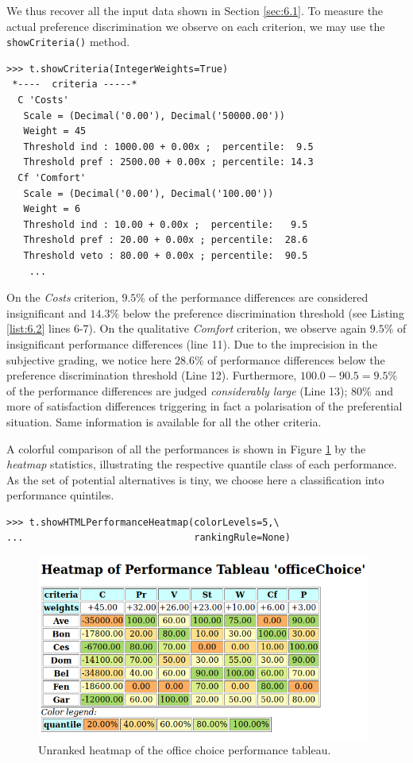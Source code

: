 We thus recover all the input data shown in Section \ref{sec:6.1}. To measure the actual preference discrimination we observe on each criterion, we may use the \texttt{showCriteria()} method.
\begin{lstlisting}[caption={Inspecting the performance criteria},label=list:6.2]
>>> t.showCriteria(IntegerWeights=True)
 *----  criteria -----*
  C 'Costs'
   Scale = (Decimal('0.00'), Decimal('50000.00'))
   Weight = 45
   Threshold ind : 1000.00 + 0.00x ;  percentile:  9.5
   Threshold pref : 2500.00 + 0.00x ; percentile: 14.3
  Cf 'Comfort'
   Scale = (Decimal('0.00'), Decimal('100.00'))
   Weight = 6
   Threshold ind : 10.00 + 0.00x ;  percentile:   9.5
   Threshold pref : 20.00 + 0.00x ; percentile:  28.6
   Threshold veto : 80.00 + 0.00x ; percentile:  90.5
    ...
\end{lstlisting}
On the \emph{Costs} criterion, $9.5\%$ of the performance differences are considered insignificant and $14.3\%$ below the preference discrimination threshold (see Listing \ref{list:6.2} lines 6-7). On the qualitative \emph{Comfort} criterion, we observe again $9.5\%$ of insignificant performance differences (line 11). Due to the imprecision in the subjective grading, we notice here $28.6\%$ of performance differences below the preference discrimination threshold (Line 12). Furthermore, $100.0 - 90.5 = 9.5\%$ of the performance differences are judged \emph{considerably large} (Line 13); $80\%$ and more of satisfaction differences triggering in fact a polarisation of the preferential situation. Same information is available for all the other criteria. 
 
A colorful comparison of all the performances is shown in Figure \ref{fig:6.1} by the \emph{heatmap} statistics, illustrating the respective quantile class of each performance. As the set of potential alternatives is tiny, we choose here a classification into performance quintiles.
\begin{lstlisting}
>>> t.showHTMLPerformanceHeatmap(colorLevels=5,\
...                              rankingRule=None)
\end{lstlisting}
    \begin{figure}[h]
\includegraphics[width=11cm]{Figures/officeChoiceHeatmap.png}
\caption{Unranked heatmap of the office choice performance tableau.}
\label{fig:6.1}       %
\end{figure}

